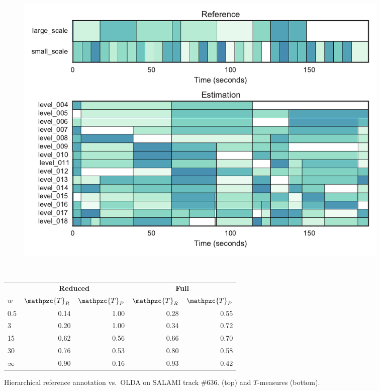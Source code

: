 \documentclass{article}
\def\shag{\ensuremath{\mathpzc{T}}}
\begin{document}
\begin{figure}[t]
  \centering
  \begin{subfigure}{\columnwidth}
    \centering
   \includegraphics[width=\columnwidth]{figs/SALAMI-OLDA}
  \end{subfigure}%
  \\
  \vspace{-\baselineskip}
  \begin{minipage}{\columnwidth}
    \small
    \centering
    \vspace{10pt}
    \begin{tabular}{l|rr|rr}
      & \multicolumn{2}{c|}{\textbf{Reduced}} & \multicolumn{2}{c}{\textbf{Full}} \\
      $w$       & $\shag_R$    & $\shag_P$  & $\shag_R$ & $\shag_P$    \\
      \hline
      0.5       & 0.14       & 1.00  & 0.28 & 0.55 \\
      3         & 0.20       & 1.00  & 0.34 & 0.72    \\
      15        & 0.62       & 0.56  & 0.66 & 0.70 \\
      30        & 0.76       & 0.53  & 0.80 & 0.58  \\
      $\infty$  & 0.90       & 0.16  & 0.93 & 0.42
  \end{tabular}
  \end{minipage}
  \caption{Hierarchical reference annotation vs.\ OLDA on SALAMI track \#636.
  (top) and $T$-measures (bottom).}
  \label{fig:SALAMI-OLDA}
\end{figure}
\end{document}
